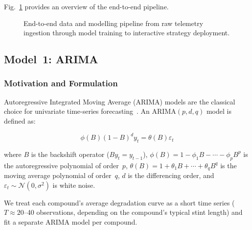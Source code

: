\documentclass[journal,twoside]{IEEEtran}
\begin{document}
Fig.~\ref{fig:pipeline} provides an overview of the end-to-end
pipeline.

\begin{figure}[!t]
\centering
{}
\caption{End-to-end data and modelling pipeline from raw telemetry
ingestion through model training to interactive strategy deployment.}
\label{fig:pipeline}
\end{figure}

\subsection{Model~1: ARIMA}\label{sec:arima}

\subsubsection{Motivation and Formulation}

Autoregressive Integrated Moving Average (ARIMA) models are the
classical choice for univariate time-series
forecasting~\cite{box2015time}.  An ARIMA$(p,d,q)$ model is defined as:

\begin{equation}
  \phi(B)(1-B)^d y_t = \theta(B)\varepsilon_t
  \label{eq:arima}
\end{equation}

\noindent where $B$ is the backshift operator ($By_t = y_{t-1}$),
$\phi(B) = 1 - \phi_1 B - \cdots - \phi_p B^p$ is the autoregressive
polynomial of order~$p$, $\theta(B) = 1 + \theta_1 B + \cdots +
\theta_q B^q$ is the moving average polynomial of order~$q$, $d$ is
the differencing order, and $\varepsilon_t \sim \mathcal{N}(0,
\sigma^2)$ is white noise.

We treat each compound's average degradation curve as a short time
series ($T \approx 20$--40 observations, depending on the compound's
typical stint length) and fit a separate ARIMA model per compound.
\end{document}
